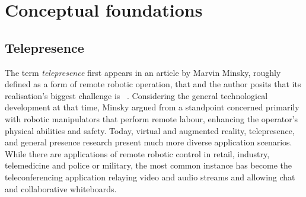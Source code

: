 \chapter{Conceptual foundations}
\label{ch:conceptualfoundations}

\section{Telepresence}
\label{sec:telepresence}

The term \emph{telepresence} first appears in an article by Marvin Minsky, roughly defined as a form of remote robotic operation, that  and the author posits that its realisation's biggest challenge is ~\parencite{minskyTelepresence}.
Considering the general technological development at that time, Minsky argued from a standpoint concerned primarily with robotic manipulators that perform remote labour, enhancing the operator's physical abilities and safety.
Today, virtual and augmented reality, telepresence, and general presence research present much more diverse application scenarios.
While there are applications of remote robotic control in retail, industry, telemedicine and police or military, the most common instance has become the teleconferencing application relaying video and audio streams and allowing chat and collaborative whiteboards.

